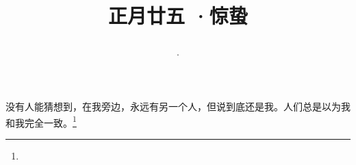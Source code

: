 \title{\date[d=5,m=3,y=2024][year:cn-y,年,month:cn,day:cn,日,·,weekday]·正月廿五 ·惊蛰}
没有人能猜想到，在我旁边，永远有另一个人，但说到底还是我。人们总是以为我和我完全一致。\footnote{ }

